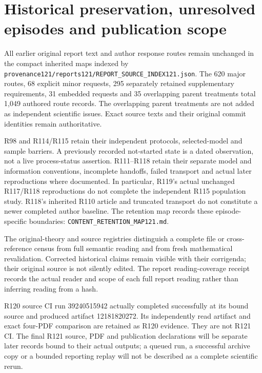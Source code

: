 \section{Historical preservation, unresolved episodes and publication scope}
All earlier original report text and author response routes remain unchanged
in the compact inherited maps indexed by
\nolinkurl{provenance121/reports121/REPORT_SOURCE_INDEX121.json}.
The 620 major routes, 68 explicit minor requests, 295 separately retained
supplementary requirements, 31 embedded requests and 35 overlapping parent
treatments total 1,049 authored route records. The overlapping parent
treatments are not added as independent scientific issues. Exact source
texts and their original commit identities remain authoritative.

R98 and R114/R115 retain their independent protocols, selected-model and
sample barriers. A previously recorded not-started state is a dated
observation, not a live process-status assertion. R111--R118 retain their
separate model and information conventions, incomplete handoffs, failed
transport and actual later reproductions where documented. In particular,
R119's actual unchanged R117/R118 reproductions do not complete the
independent R115 population study. R118's inherited R110 article and
truncated transport do not constitute a newer completed author baseline.
The retention map records these episode-specific boundaries:
\nolinkurl{CONTENT_RETENTION_MAP121.md}.

The original-theory and source registries distinguish a complete file or
cross-reference census from full semantic reading and from fresh
mathematical revalidation. Corrected historical claims remain visible
with their corrigenda; their original source is not silently edited.
The report reading-coverage receipt records the actual reader and scope
of each full report reading rather than inferring reading from a hash.

R120 source CI run 39240515942 actually completed successfully at its bound
source and produced artifact 12181820272. Its independently read artifact
and exact four-PDF comparison are retained as R120 evidence. They are not
R121 CI. The final R121 source, PDF and publication declarations will be
separate later records bound to their actual outputs; a queued run, a
successful archive copy or a bounded reporting replay will not be described
as a complete scientific rerun.
